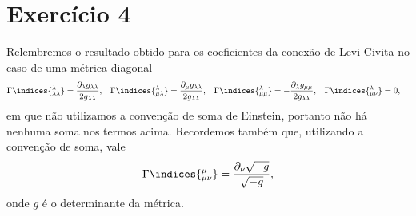 \section*{Exercício 4}

Relembremos o resultado obtido para os coeficientes da conexão de Levi-Civita no caso de uma métrica diagonal
\begin{align*}
    \Gamma\indices{^\lambda_{\lambda\lambda}} &=\frac{\partial_{\lambda}g_{\lambda \lambda}}{2g_{\lambda \lambda}},&
    \Gamma\indices{^\lambda_{\mu\lambda}} &= \frac{\partial_{\mu}g_{\lambda \lambda}}{2g_{\lambda \lambda}},&
    \Gamma\indices{^\lambda_{\mu\mu}} &= -\frac{\partial_{\lambda}g_{\mu\mu}}{2g_{\lambda \lambda}},&
    \Gamma\indices{^\lambda_{\mu\nu}} &= 0,
\end{align*}
em que não utilizamos a convenção de soma de Einstein, portanto não há nenhuma soma nos termos acima. Recordemos também que, utilizando a convenção de soma, vale
\begin{equation*}
    \Gamma\indices{^\mu_{\mu\nu}} = \frac{\partial_\nu \sqrt{-g}}{\sqrt{-g}},
\end{equation*}
onde \(g\) é o determinante da métrica.

